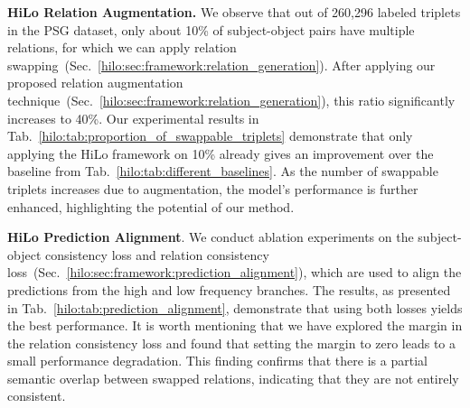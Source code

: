 \noindent \textbf{HiLo Relation Augmentation.}
We observe that out of 260,296 labeled triplets in the PSG dataset, only about 10\% of subject-object pairs have multiple relations, for which we can apply relation swapping~(Sec.~\ref{hilo:sec:framework:relation_generation}).
After applying our proposed relation augmentation technique~(Sec.~\ref{hilo:sec:framework:relation_generation}), this ratio significantly increases to 40\%.
Our experimental results in Tab.~\ref{hilo:tab:proportion_of_swappable_triplets} demonstrate that only applying the HiLo framework on 10\% already gives an improvement over the baseline from Tab.~\ref{hilo:tab:different_baselines}. As the number of swappable triplets increases due to augmentation, the model's performance is further enhanced, highlighting the potential of our method.

\begin{table}
\centering
\setlength{\tabcolsep}{8pt}
\caption{Ablation study for HiLo relation augmentation. Relation augmentation affects the ratio of subject-object pairs with multiple relations. The larger this ratio, the more relations can be swapped, which leads to better results.
}
\label{hilo:tab:proportion_of_swappable_triplets}
\end{table}

\noindent \textbf{HiLo Prediction Alignment}.
We conduct ablation experiments on the subject-object consistency loss and relation consistency loss~(Sec.~\ref{hilo:sec:framework:prediction_alignment}), which are used to align the predictions from the high and low frequency branches.
The results, as presented in Tab.~\ref{hilo:tab:prediction_alignment}, demonstrate that using both losses yields the best performance.
It is worth mentioning that we have explored the margin in the relation consistency loss and found that setting the margin to zero leads to a small performance degradation.
This finding confirms that there is a partial semantic overlap between swapped relations, indicating that they are not entirely consistent.


